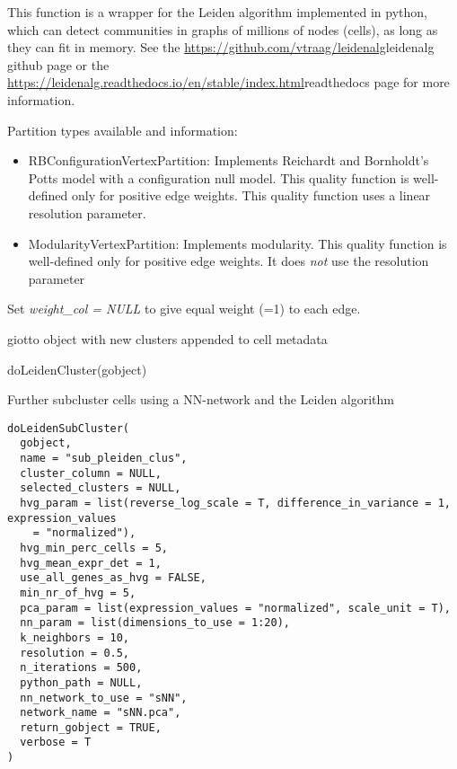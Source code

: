 \documentclass[a4paper]{book}
\begin{document}
%
\begin{Details}\relax
This function is a wrapper for the Leiden algorithm implemented in python,
which can detect communities in graphs of millions of nodes (cells),
as long as they can fit in memory. See the \url{https://github.com/vtraag/leidenalg}leidenalg
github page or the \url{https://leidenalg.readthedocs.io/en/stable/index.html}readthedocs
page for more information.

Partition types available and information:
\begin{itemize}

\item{} RBConfigurationVertexPartition: Implements Reichardt and Bornholdt’s Potts model
with a configuration null model. This quality function is well-defined only for positive edge weights.
This quality function uses a linear resolution parameter.
\item{} ModularityVertexPartition: Implements modularity.
This quality function is well-defined only for positive edge weights. It does \emph{not} use the resolution parameter

\end{itemize}


Set \emph{weight\_col = NULL} to give equal weight (=1) to each edge.
\end{Details}
%
\begin{Value}
giotto object with new clusters appended to cell metadata
\end{Value}
%
\begin{Examples}
\begin{ExampleCode}
    doLeidenCluster(gobject)
\end{ExampleCode}
\end{Examples}
%
\begin{Description}\relax
Further subcluster cells using a NN-network and the Leiden algorithm
\end{Description}
%
\begin{Usage}
\begin{verbatim}
doLeidenSubCluster(
  gobject,
  name = "sub_pleiden_clus",
  cluster_column = NULL,
  selected_clusters = NULL,
  hvg_param = list(reverse_log_scale = T, difference_in_variance = 1, expression_values
    = "normalized"),
  hvg_min_perc_cells = 5,
  hvg_mean_expr_det = 1,
  use_all_genes_as_hvg = FALSE,
  min_nr_of_hvg = 5,
  pca_param = list(expression_values = "normalized", scale_unit = T),
  nn_param = list(dimensions_to_use = 1:20),
  k_neighbors = 10,
  resolution = 0.5,
  n_iterations = 500,
  python_path = NULL,
  nn_network_to_use = "sNN",
  network_name = "sNN.pca",
  return_gobject = TRUE,
  verbose = T
)
\end{verbatim}
\end{Usage}
\end{document}
